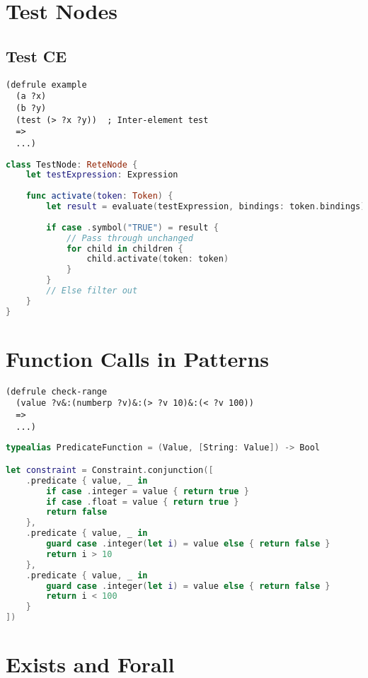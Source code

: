 \section{Test Nodes}

\subsection{Test CE}

\begin{lstlisting}[language=CLIPS]
(defrule example
  (a ?x)
  (b ?y)
  (test (> ?x ?y))  ; Inter-element test
  =>
  ...)
\end{lstlisting}

\begin{lstlisting}[language=Swift]
class TestNode: ReteNode {
    let testExpression: Expression
    
    func activate(token: Token) {
        let result = evaluate(testExpression, bindings: token.bindings)
        
        if case .symbol("TRUE") = result {
            // Pass through unchanged
            for child in children {
                child.activate(token: token)
            }
        }
        // Else filter out
    }
}
\end{lstlisting}

\section{Function Calls in Patterns}

\begin{lstlisting}[language=CLIPS]
(defrule check-range
  (value ?v&:(numberp ?v)&:(> ?v 10)&:(< ?v 100))
  =>
  ...)
\end{lstlisting}

\begin{lstlisting}[language=Swift]
typealias PredicateFunction = (Value, [String: Value]) -> Bool

let constraint = Constraint.conjunction([
    .predicate { value, _ in
        if case .integer = value { return true }
        if case .float = value { return true }
        return false
    },
    .predicate { value, _ in
        guard case .integer(let i) = value else { return false }
        return i > 10
    },
    .predicate { value, _ in
        guard case .integer(let i) = value else { return false }
        return i < 100
    }
])
\end{lstlisting}

\section{Exists and Forall}

